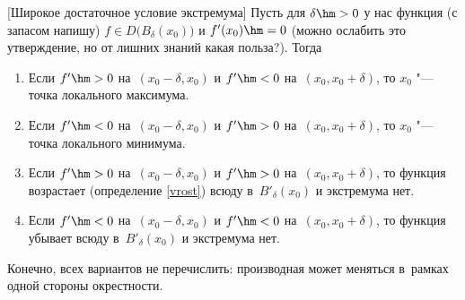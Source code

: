 [Широкое достаточное условие экстремума]\label{shir} Пусть для $\delta\hm>0$ у нас функция (с запасом напишу)
 $f\in D\big(B_\delta(x_0)\big)$ и $f'(x_0)\hm=0$
(можно ослабить это утверждение, но от лишних знаний какая польза?).
Тогда

\begin{enumerate}
    \item Если $f'\hm>0$ на~$(x_0-\delta,x_0)$ и $f'\hm<0$ на~$(x_0,x_0+\delta)$, то $x_0$ "--- точка локального максимума.

    \item Если $f'\hm<0$ на~$(x_0-\delta,x_0)$ и $f'\hm>0$ на~$(x_0,x_0+\delta)$, то $x_0$ "--- точка локального минимума.

    \item Если $f'\hm>0$ на~$(x_0-\delta,x_0)$ и $f'\hm>0$ на~$(x_0,x_0+\delta)$, то функция возрастает (определение \ref{vrost}) всюду в~$B'_\delta(x_0)$ и экстремума нет.

    \item Если $f'\hm<0$ на~$(x_0-\delta,x_0)$ и $f'\hm<0$ на~$(x_0,x_0+\delta)$, то функция убывает всюду в~$B'_\delta(x_0)$ и экстремума нет.
\end{enumerate}

Конечно, всех вариантов не перечислить: производная может меняться в~рамках одной стороны окрестности.

